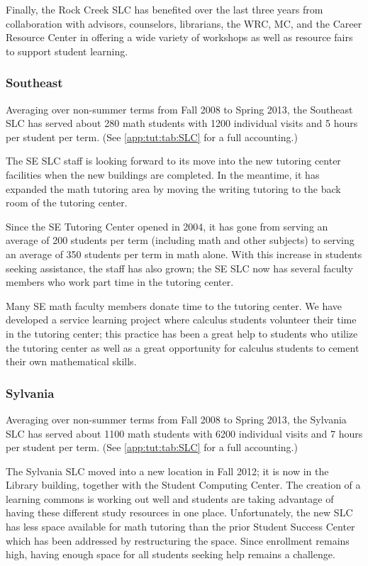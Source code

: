 Finally, the Rock Creek SLC has benefited over the last three years from collaboration
with advisors, counselors, librarians, the WRC, MC, and the Career Resource
Center in offering a wide variety of workshops as well as resource fairs to
support student learning. 

\subsubsection{Southeast}
Averaging over non-summer terms from Fall 2008 to Spring 2013, the Southeast SLC has served about 
280 math students with 1200 individual visits and 5 hours per student per term. (See \vref{app:tut:tab:SLC} for a full accounting.) 

The SE SLC staff is looking forward to its move into the new tutoring center
facilities when the new buildings are completed. In the meantime, it has
expanded the math tutoring area by moving the writing tutoring to the back room
of the tutoring center.  

Since the SE Tutoring Center opened in 2004, it has gone from serving an
average of 200 students per term (including math and other subjects) to serving an average of 350 students per term in math alone.  With this increase in students
seeking assistance, the staff has also grown; the SE SLC now has several faculty
members who work part time in the tutoring center. 

Many SE math faculty members donate time to the tutoring center. We have
developed a service learning project where calculus students volunteer their
time in the tutoring center; this practice has been a great help to
students who utilize the tutoring center as well as a great opportunity for
calculus students to cement their own mathematical skills.

\subsubsection{Sylvania}
Averaging over non-summer terms from Fall 2008 to Spring 2013, the Sylvania SLC has served about 
1100 math students with 6200 individual visits and 7 hours per student per term. (See \vref{app:tut:tab:SLC} for a full accounting.) 

The Sylvania SLC moved into a new location in Fall 2012; it is now in
the Library building, together with the Student Computing Center. The creation
of a learning commons is working out well and students are taking advantage of
having these different study resources in one place. Unfortunately, the new SLC
has less space available for math tutoring than the prior Student Success Center
which has been addressed by restructuring the space. Since enrollment remains high, having enough space
for all students seeking help remains a challenge.

